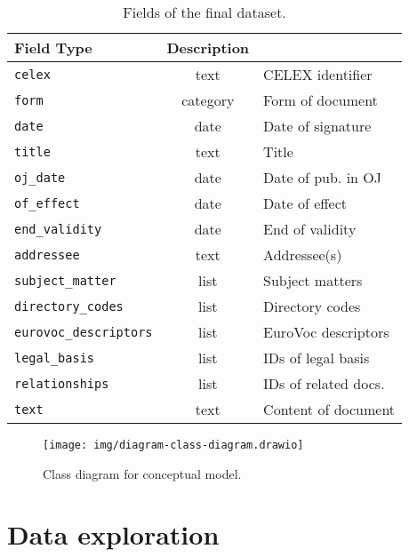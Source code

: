 \documentclass[sigconf, authorversion]{acmart}
\begin{document}
\begin{table}[h]
    \centering
    \caption{Fields of the final dataset.} \label{tab:fields}
    \begin{tabular}{@{}l|c|l@{}}
        \textbf{Field}               \textbf{Type}   & \textbf{Description}    \\ \hline
        \texttt{celex}                  & text            & CELEX identifier        \\
        \texttt{form}                   & category        & Form of document        \\
        \texttt{date}                   & date            & Date of signature       \\
        \texttt{title}                  & text            & Title                   \\
        \texttt{oj\_date}               & date            & Date of pub. in OJ      \\
        \texttt{of\_effect}             & date            & Date of effect          \\
        \texttt{end\_validity}          & date            & End of validity         \\
        \texttt{addressee}              & text            & Addressee(s)            \\
        \texttt{subject\_matter}        & list            & Subject matters         \\
        \texttt{directory\_codes}       & list            & Directory codes         \\
        \texttt{eurovoc\_descriptors}   & list            & EuroVoc descriptors     \\
        \texttt{legal\_basis}           & list            & IDs of legal basis      \\
        \texttt{relationships}          & list            & IDs of related docs.    \\
        \texttt{text}                   & text            & Content of document     \\
    \end{tabular}
\end{table}

\begin{figure}
  \texttt{[image: img/diagram-class-diagram.drawio]}
  \caption{Class diagram for conceptual model.}
  \label{fig:class-diagram}
\end{figure}

\section{Data exploration}
\label{sec:data-exploration}
\end{document}
